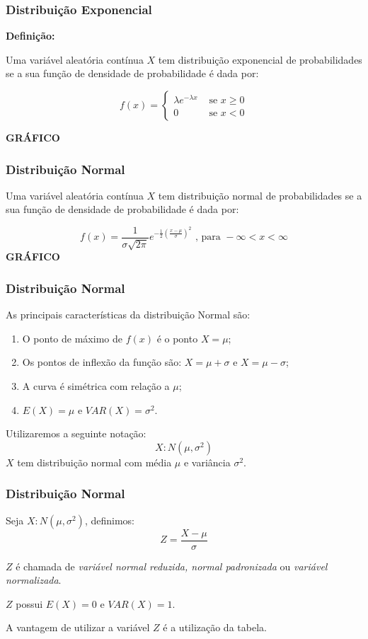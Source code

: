 \documentclass[hyperref={pdfpagelabels=false}]{beamer}
\begin{document}
\begin{frame}
\frametitle{Distribuição Exponencial}

{\bf Definição:}

Uma variável aleatória contínua $X$ tem distribuição exponencial de probabilidades se a sua função de densidade de probabilidade é dada por:
	\pause
	
$$f(x) = \begin{cases}
\lambda e^{-\lambda x} &\text{ se } x \geq 0 \\
0 &\text{ se } x < 0
\end{cases}$$
\pause

{\bf GRÁFICO}

\end{frame}

\begin{frame}
\frametitle{Distribuição Normal}

Uma variável aleatória contínua $X$ tem distribuição normal de probabilidades se a sua função de densidade de probabilidade é dada por:

\pause
$$
f(x) = \displaystyle \frac{1}{\sigma \sqrt{2\pi}}e^{- \displaystyle \frac{1}{2}\left( \displaystyle \frac{x - \mu}{\sigma} \right)^2 } \text{ , para } -\infty < x < \infty
$$
\pause
{\bf GRÁFICO}
	
\end{frame}

\begin{frame}
\frametitle{Distribuição Normal}

As principais características da distribuição Normal são: \pause
\begin{enumerate}
	\item O ponto de máximo de $f(x)$ é o ponto $X = \mu$; \pause
	\item Os pontos de inflexão da função são: $X = \mu + \sigma$ e $X = \mu - \sigma$; \pause
	\item A curva é simétrica com relação a $\mu$; \pause
	\item $E(X) = \mu$ e $VAR(X) = \sigma^2$. \pause
\end{enumerate}

Utilizaremos a seguinte notação:
$$X: N(\mu,\sigma^2)$$ \pause
$X$ tem distribuição normal com média $\mu$ e variância $\sigma^2$.
\end{frame}


\begin{frame}
\frametitle{Distribuição Normal}

Seja $X: N(\mu,\sigma^2)$, definimos: \pause
$$Z = \displaystyle \frac{X - \mu}{\sigma}$$

\pause
$Z$ é chamada de \emph{variável normal reduzida, normal padronizada} ou \emph{variável normalizada}.

\pause
$Z$ possui $E(X) = 0$ e $VAR(X) = 1$.

\pause
A vantagem de utilizar a variável $Z$ é a utilização da tabela.
\end{frame}
\end{document}
